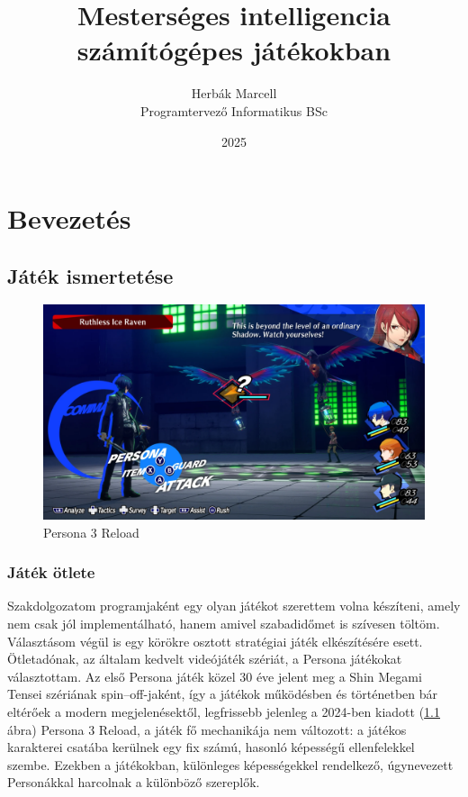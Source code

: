 \documentclass[
]{thesis-ekf}
\theoremstyle{definition}
\theoremstyle{remark}
\begin{document}
\title{Mesterséges intelligencia számítógépes játékokban}
\author{Herbák Marcell\\Programtervező Informatikus BSc}
\date{2025}
\maketitle

\tableofcontents

\chapter{Bevezetés}

\section{Játék ismertetése}

\begin{figure}[h!]
	\centering
	\includegraphics[width=14cm]{./pictures/persona3_xbox.png}
	\caption{Persona 3 Reload}
	\label{persona3}
\end{figure}

\subsection{Játék ötlete}

Szakdolgozatom programjaként egy olyan játékot szerettem volna készíteni, amely nem csak jól implementálható, hanem amivel szabadidőmet is szívesen töltöm. Választásom végül is egy körökre osztott stratégiai játék elkészítésére esett. Ötletadónak, az általam kedvelt videójáték szériát, a Persona játékokat választottam. Az első Persona játék közel 30 éve jelent meg a Shin Megami Tensei szériának spin--off-jaként, így a játékok működésben és történetben bár eltérőek a modern megjelenésektől, legfrissebb jelenleg a 2024-ben kiadott (\ref{persona3} ábra) Persona 3 Reload, a játék fő mechanikája nem változott: a játékos karakterei csatába kerülnek egy fix számú, hasonló képességű ellenfelekkel szembe. Ezekben a játékokban, különleges képességekkel rendelkező, úgynevezett Personákkal harcolnak a különböző szereplők.\cite{Persona,Persona3}
\end{document}

